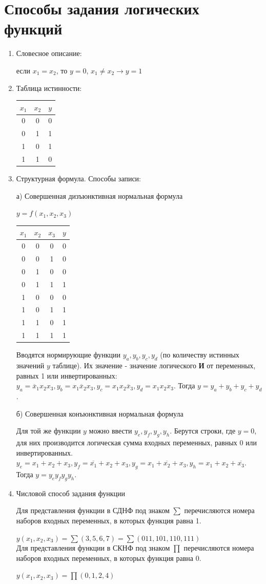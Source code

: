 \documentclass[a4paper,12pt]{report}
\begin{document}
\section{Способы задания логических функций}
\begin{enumerate}
\item Словесное описание:

если $x_1=x_2$, то $y=0$, $x_1 \not= x_2 \to y=1$
\item Таблица истинности:
\begin{tabular}{ c | c | c }
  $x_1$ & $x_2$ & $y$ \\ \hline
  0 & 0 & 0 \\
  0 & 1 & 1 \\
  1 & 0 & 1 \\
  1 & 1 & 0 \\
\end{tabular}
\item Структурная формула. Способы записи:

а) Совершенная дизъюнктивная нормальная формула

$y=f(x_1, x_2, x_3) \quad$
\begin{tabular}{ c | c | c | c }
  $x_1$ & $x_2$ & $x_3$ & $y$ \\ \hline
  0 & 0 & 0 & 0 \\
  0 & 0 & 1 & 0 \\
  0 & 1 & 0 & 0 \\
  0 & 1 & 1 & 1 \\
  1 & 0 & 0 & 0 \\
  1 & 0 & 1 & 1 \\
  1 & 1 & 0 & 1\\
  1 & 1 & 1 & 1 \\
\end{tabular}

Вводятся нормирующие функции $y_a, y_b, y_c, y_d$ (по количеству истинных значений $y$ таблице). Их значение - значение логического \textbf{И} от переменных, равных 1 или инвертированных: $y_a=\overline{x}_1x_2x_3, y_b=x_1\overline{x}_2x_3, y_c=x_1x_2\overline{x}_3, y_d=x_1x_2x_3$. Тогда $y=y_a+y_b+y_c+y_d$.

б) Совершенная конъюнктивная нормальная формула

Для той же функции $y$ можно ввести $y_e, y_f, y_g, y_h$. Берутся строки, где $y=0$, для них производится логическая сумма входных переменных, равных 0 или инвертированных. $y_e=x_1+x_2+x_3, y_f=\overline{x_1}+x_2+x_3, y_g=x_1+\overline{x_2}+x_3, y_h=x_1+x_2+\overline{x_3}$. Тогда $y=y_ey_fy_gy_h$.
\item Числовой способ задания функции

Для представления функции в СДНФ под знаком $\sum$ перечисляются номера наборов входных переменных, в которых функция равна 1.

$y(x_1, x_2, x_3)=\sum(3, 5, 6, 7)=\sum(011, 101, 110, 111)$\\

Для представления функции в СКНФ под знаком $\prod$ перечисляются номера наборов входных переменных, в которых функция равна 0.

$y(x_1, x_2, x_3)=\prod(0, 1, 2, 4)$
\end{enumerate}
\end{document}
